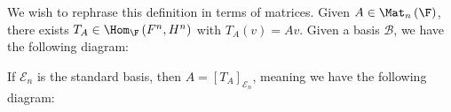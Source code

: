 \documentclass[10pt]{mypackage}
\begin{document}
We wish to rephrase this definition in terms of matrices. Given $A\in \Mat_{n}\left(\F\right)$, there exists $T_A\in \Hom_{\F}\left(F^n,H^n\right)$ with $T_A(v) = Av$. Given a basis $\mathcal{B}$, we have the following diagram:
\begin{center}
\end{center}
If $\mathcal{E}_n$ is the standard basis, then $A = \left[T_{A}\right]_{\mathcal{E}_n}$, meaning we have the following diagram:
\begin{center}
\end{center}
\end{document}
